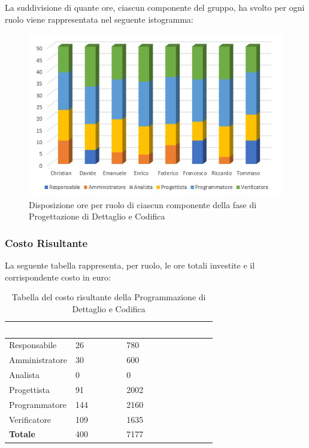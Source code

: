 La suddivisione di quante ore, ciascun componente del gruppo, ha svolto per ogni ruolo viene rappresentata nel seguente istogramma:
\begin{figure}[h!]
\centering
\includegraphics[scale=2.5]{Sezioni/Istogrammi/IstogrammaDiDettaglio.png}
\caption{Disposizione ore per ruolo di ciascun componente della fase di Progettazione di Dettaglio e Codifica}
\end{figure}

\clearpage

\subsubsection{Costo Risultante}
La seguente tabella rappresenta, per ruolo, le ore totali investite e il corrispondente costo in euro:
{
\renewcommand{\arraystretch}{2}
\centering
\begin{longtable}{ C{3cm} C{2cm} C{4cm}}
\caption{Tabella del costo risultante della Programmazione di Dettaglio e Codifica}\\

\textcolor{white}{\textbf{Ruolo}} & 
\textcolor{white}{\textbf{Totale ore}} & 
\textcolor{white}{\textbf{Costo ruolo in euro}}\\	
\endhead
        
Responsabile    &  26 &  780 \\
Amministratore  &  30 &  600 \\
Analista        &   0 &    0 \\
Progettista     &  91 & 2002 \\
Programmatore   & 144 & 2160 \\
Verificatore    & 109 & 1635 \\
\textbf{Totale} & 400 & 7177 \\
		
\end{longtable}
}

